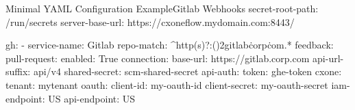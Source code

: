 \begin{code}{Minimal YAML Configuration Example}{Gitlab Webhooks}{}
  secret-root-path: /run/secrets
  server-base-url: https://cxoneflow.mydomain.com:8443/
  
  gh:
      - service-name: Gitlab
        repo-match: ^http(s)?:(\/){2}gitlab\.corp\.com.*
        feedback:
          pull-request:
            enabled: True
        connection:
          base-url: https://gitlab.corp.com
          api-url-suffix: api/v4
          shared-secret: scm-shared-secret
          api-auth:
            token: ghe-token
        cxone:
          tenant: mytenant
          oauth:
            client-id: my-oauth-id
            client-secret: my-oauth-secret
          iam-endpoint: US
          api-endpoint: US
\end{code}
    